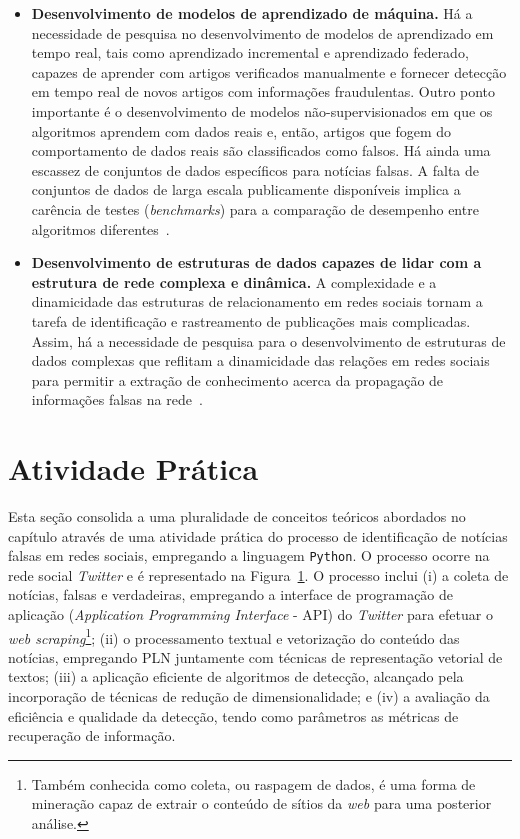 \documentclass{SBCbookchapter}
\begin{document}
\begin{itemize}
    \item {\bf Desenvolvimento de modelos de aprendizado de máquina.} Há a necessidade de pesquisa no desenvolvimento de modelos de aprendizado em tempo real, tais como aprendizado incremental e aprendizado federado, capazes de aprender com artigos verificados manualmente e fornecer detecção em tempo real de novos artigos com informações fraudulentas. Outro ponto importante é o desenvolvimento de modelos não-supervisionados em que os algoritmos aprendem com dados reais e, então, artigos que fogem do comportamento de dados reais são classificados como falsos. Há ainda uma escassez de conjuntos de dados específicos para notícias falsas. A falta de conjuntos de dados de larga escala publicamente disponíveis implica a carência de testes (\textit{benchmarks}) para a comparação de desempenho entre algoritmos diferentes~\cite{meel2020}.


    \item {\bf Desenvolvimento de estruturas de dados capazes de lidar com a estrutura de rede complexa e dinâmica.}  A complexidade e a dinamicidade das estruturas de relacionamento em redes sociais tornam a tarefa de identificação e rastreamento de publicações mais complicadas. Assim, há a necessidade de pesquisa para o desenvolvimento de estruturas de dados complexas que reflitam a dinamicidade das relações em redes sociais para permitir a extração de conhecimento acerca da propagação de informações falsas na rede~\cite{meel2020}.

\end{itemize}

\section{Atividade Prática}
\label{sec:pratica}

Esta seção consolida a uma pluralidade de conceitos teóricos abordados no capítulo através de uma atividade prática do processo de identificação de notícias falsas em redes sociais, empregando a linguagem \texttt{Python}. O processo ocorre na rede social \textit{Twitter} e é representado na Figura~\ref{sec:pratica}. O processo inclui (i) a coleta de notícias, falsas e verdadeiras, empregando a interface de programação de aplicação (\textit{Application Programming Interface} - API) do \textit{Twitter} para efetuar o \textit{web scraping}\footnote{Também conhecida como coleta, ou raspagem de dados, é uma forma de mineração capaz de extrair o conteúdo de sítios da \textit{web} para uma posterior análise.}; (ii) o processamento textual e vetorização do conteúdo das notícias, empregando PLN juntamente com técnicas de representação vetorial de textos; (iii) a aplicação eficiente de algoritmos de detecção, alcançado pela incorporação de técnicas de redução de dimensionalidade; e (iv) a avaliação da eficiência e qualidade da detecção, tendo como parâmetros as métricas de recuperação de informação.
\end{document}
